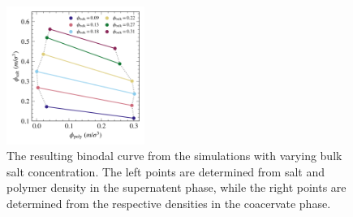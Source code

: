 \documentclass[10pt,a4paper]{labreport}
\begin{document}
\begin{figure}[h]
  \centering  
  \includegraphics[width = 0.4\textwidth]{figs/ass4_binodalcurve.png}
  \caption{The resulting binodal curve from the simulations with varying bulk salt concentration. The left points are determined from salt and polymer density in the supernatent phase, while the right points are determined from the respective densities in the coacervate phase. }
  \label{fig:ass4_equlib}
\end{figure}

\printbibliography

%   
\end{document}
